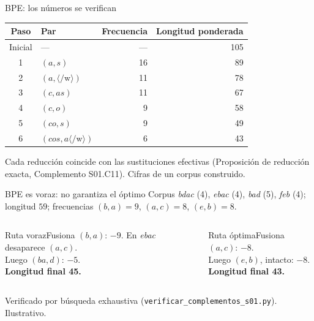 \documentclass[aspectratio=169,10pt]{beamer}
\begin{document}
\begin{frame}{BPE: los números se verifican}
\centering\begin{tabular}{clrr}\toprule Paso&Par&Frecuencia&Longitud ponderada\\\midrule
Inicial&---&---&105\\1&$(a,s)$&16&89\\2&$(a,\langle/\mathrm w\rangle)$&11&78\\3&$(c,as)$&11&67\\4&$(c,o)$&9&58\\5&$(co,s)$&9&49\\6&$(cos,a\langle/\mathrm w\rangle)$&6&43\\\bottomrule\end{tabular}
\vspace{3mm}\small Cada reducción coincide con las sustituciones efectivas (Proposición de reducción exacta, Complemento S01.C11). Cifras de un corpus construido.
\end{frame}

\begin{frame}{BPE es voraz: no garantiza el óptimo}
\small Corpus \emph{bdac} (4), \emph{ebac} (4), \emph{bad} (5), \emph{feb} (4); longitud $59$; frecuencias $(b,a)=9$, $(a,c)=8$, $(e,b)=8$.
\begin{columns}[T]
\begin{block}{Ruta voraz}Fusiona $(b,a)$: $-9$. En \emph{ebac} desaparece $(a,c)$.\\ Luego $(ba,d)$: $-5$.\\ \textbf{Longitud final 45.}\end{block}
\begin{block}{Ruta óptima}Fusiona $(a,c)$: $-8$.\\ Luego $(e,b)$, intacto: $-8$.\\ \textbf{Longitud final 43.}\end{block}
\end{columns}
\vspace{2mm}\centering\scriptsize Verificado por búsqueda exhaustiva (\texttt{verificar\_complementos\_s01.py}). Ilustrativo.
\end{frame}

\end{document}
